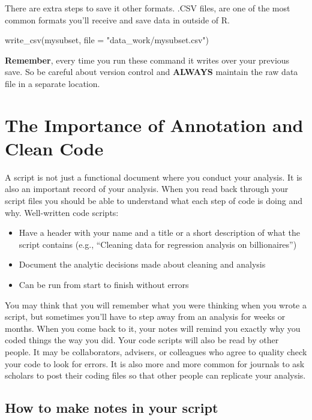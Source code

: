 \documentclass[
]{book}
\newenvironment{Shaded}{\begin{snugshade}}{\end{snugshade}}
\newcommand{\AttributeTok}[1]{\textcolor[rgb]{0.77,0.63,0.00}{#1}}
\newcommand{\FunctionTok}[1]{\textcolor[rgb]{0.00,0.00,0.00}{#1}}
\newcommand{\NormalTok}[1]{#1}
\newcommand{\StringTok}[1]{\textcolor[rgb]{0.31,0.60,0.02}{#1}}
\providecommand{\tightlist}{%
  \setlength{\itemsep}{0pt}\setlength{\parskip}{0pt}}
\begin{document}
There are extra steps to save it other formats. .CSV files, are one of the most common formats you'll receive and save data in outside of R.

\begin{Shaded}
\begin{Highlighting}[]
\FunctionTok{write\_csv}\NormalTok{(mysubset, }\AttributeTok{file =} \StringTok{"data\_work/mysubset.csv"}\NormalTok{)}
\end{Highlighting}
\end{Shaded}

\textbf{Remember}, every time you run these command it writes over your previous save. So be careful about version control and \textbf{ALWAYS} maintain the raw data file in a separate location.

\hypertarget{annotate}{%
\section{The Importance of Annotation and Clean Code}\label{annotate}}

A script is not just a functional document where you conduct your analysis. It is also an important record of your analysis. When you read back through your script files you should be able to understand what each step of code is doing and why. Well-written code scripts:

\begin{itemize}
\tightlist
\item
  Have a header with your name and a title or a short description of what the script contains (e.g., ``Cleaning data for regression analysis on billionaires'')
\item
  Document the analytic decisions made about cleaning and analysis
\item
  Can be run from start to finish without errors
\end{itemize}

You may think that you will remember what you were thinking when you wrote a script, but sometimes you'll have to step away from an analysis for weeks or months. When you come back to it, your notes will remind you exactly why you coded things the way you did. Your code scripts will also be read by other people. It may be collaborators, advisers, or colleagues who agree to quality check your code to look for errors. It is also more and more common for journals to ask scholars to post their coding files so that other people can replicate your analysis.

\hypertarget{how-to-make-notes-in-your-script-1}{%
\subsection*{How to make notes in your script}\label{how-to-make-notes-in-your-script-1}}
\end{document}
